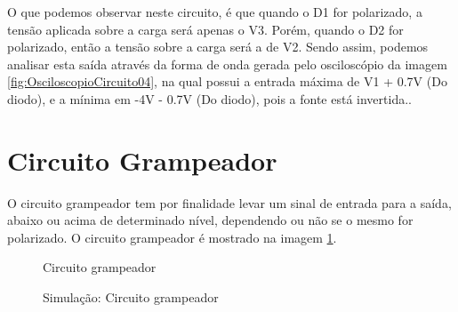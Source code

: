 O que podemos observar neste circuito, é que quando o D1 for polarizado, a tensão aplicada sobre a carga será apenas o V3. Porém, quando o D2 for polarizado, então a tensão sobre a carga será a de V2. Sendo assim, podemos analisar esta saída através da forma de onda gerada pelo osciloscópio da imagem \ref{fig:OsciloscopioCircuito04}, na qual possui a entrada máxima de V1 + 0.7V (Do diodo), e a mínima em -4V - 0.7V (Do diodo), pois a fonte está invertida..

\section{Circuito Grampeador}

O circuito grampeador tem por finalidade levar um sinal de entrada para a saída, abaixo ou acima de determinado nível, dependendo ou não se o mesmo for polarizado. O circuito grampeador é mostrado na imagem \ref{fig:ImagemSlide05}.

\begin{figure}[H]
    \centering
    \caption{Circuito grampeador}
    \vspace{-0.3cm}
    \label{fig:ImagemSlide05}
\end{figure}

\begin{figure}[H]
    \centering
    \caption{Simulação: Circuito grampeador}
    \vspace{-0.3cm}
    \label{fig:SimulacaoCircuito05}
\end{figure}


